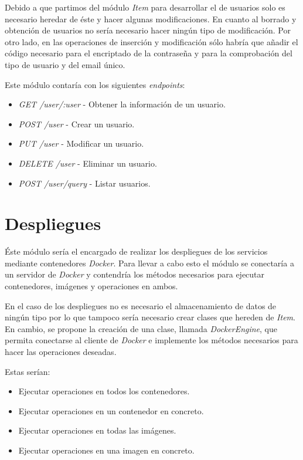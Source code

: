 \bigskip
Debido a que partimos del módulo \textit{Item} para desarrollar el de usuarios solo es necesario heredar de éste y hacer algunas modificaciones. En cuanto al borrado y obtención de usuarios no sería necesario hacer ningún tipo de modificación. Por otro lado, en las operaciones de inserción y modificación sólo habría que añadir el código necesario para el encriptado de la contraseña y para la comprobación del tipo de usuario y del email único.

\bigskip
Este módulo contaría con los siguientes \textit{endpoints}:
\begin{itemize}
	\item \textit{GET /user/:user} - Obtener la información de un usuario.
	\item \textit{POST /user} - Crear un usuario.
	\item \textit{PUT /user} - Modificar un usuario.
	\item \textit{DELETE /user} - Eliminar un usuario.
	\item \textit{POST /user/query} - Listar usuarios.
\end{itemize} 





\section{Despliegues}

Éste módulo sería el encargado de realizar los despliegues de los servicios mediante contenedores \textit{Docker}. Para llevar a cabo esto el módulo se conectaría a un servidor de \textit{Docker} y contendría los métodos necesarios para ejecutar contenedores, imágenes y operaciones en ambos.

En el caso de los despliegues no es necesario el almacenamiento de datos de ningún tipo por lo que tampoco sería necesario crear clases que hereden de \textit{Item}. En cambio, se propone la creación de una clase, llamada \textit{DockerEngine}, que permita conectarse al cliente de \textit{Docker} e implemente los métodos necesarios para hacer las operaciones deseadas.

\pagebreak
Estas serían:
\begin{itemize}
	\item Ejecutar operaciones en todos los contenedores.
	\item Ejecutar operaciones en un contenedor en concreto.
	\item Ejecutar operaciones en todas las imágenes.
	\item Ejecutar operaciones en una imagen en concreto.
\end{itemize}


